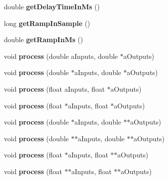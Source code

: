 \begin{DoxyCompactItemize}
\item 
\hypertarget{class_ambisonics_delay_ad0e480317457a85186ae785bb33832a4}{double {\bfseries get\-Delay\-Time\-In\-Ms} ()}\label{class_ambisonics_delay_ad0e480317457a85186ae785bb33832a4}

\item 
\hypertarget{class_ambisonics_delay_a4bd875e75bf16dfcc043bf95637ca1ed}{long {\bfseries get\-Ramp\-In\-Sample} ()}\label{class_ambisonics_delay_a4bd875e75bf16dfcc043bf95637ca1ed}

\item 
\hypertarget{class_ambisonics_delay_a1e652fc67e8033adfe2ca85e94777dd5}{double {\bfseries get\-Ramp\-In\-Ms} ()}\label{class_ambisonics_delay_a1e652fc67e8033adfe2ca85e94777dd5}

\item 
\hypertarget{class_ambisonics_delay_a689b30eb9bcc242a173326aaa0ef9902}{void {\bfseries process} (double a\-Inputs, double $\ast$a\-Outputs)}\label{class_ambisonics_delay_a689b30eb9bcc242a173326aaa0ef9902}

\item 
\hypertarget{class_ambisonics_delay_a1799746298285eab00432c5d7794bff0}{void {\bfseries process} (double $\ast$a\-Inputs, double $\ast$a\-Outputs)}\label{class_ambisonics_delay_a1799746298285eab00432c5d7794bff0}

\item 
\hypertarget{class_ambisonics_delay_ab1fbab149958d6713a77c8627c17d29a}{void {\bfseries process} (float a\-Inputs, float $\ast$a\-Outputs)}\label{class_ambisonics_delay_ab1fbab149958d6713a77c8627c17d29a}

\item 
\hypertarget{class_ambisonics_delay_ad6d98436f1652d522ef1acfecaea0c8c}{void {\bfseries process} (float $\ast$a\-Inputs, float $\ast$a\-Outputs)}\label{class_ambisonics_delay_ad6d98436f1652d522ef1acfecaea0c8c}

\item 
\hypertarget{class_ambisonics_delay_a3e443751cd4229db04e30375a76116f7}{void {\bfseries process} (double $\ast$a\-Inputs, double $\ast$$\ast$a\-Outputs)}\label{class_ambisonics_delay_a3e443751cd4229db04e30375a76116f7}

\item 
\hypertarget{class_ambisonics_delay_aeb97d99deaac12831fcb093112222594}{void {\bfseries process} (double $\ast$$\ast$a\-Inputs, double $\ast$$\ast$a\-Outputs)}\label{class_ambisonics_delay_aeb97d99deaac12831fcb093112222594}

\item 
\hypertarget{class_ambisonics_delay_a2d3baba33f0ff7e63b77cdded8d3e59b}{void {\bfseries process} (float $\ast$a\-Inputs, float $\ast$$\ast$a\-Outputs)}\label{class_ambisonics_delay_a2d3baba33f0ff7e63b77cdded8d3e59b}

\item 
\hypertarget{class_ambisonics_delay_a77e0021d85260c81457f0dd7216582e6}{void {\bfseries process} (float $\ast$$\ast$a\-Inputs, float $\ast$$\ast$a\-Outputs)}\label{class_ambisonics_delay_a77e0021d85260c81457f0dd7216582e6}

\end{DoxyCompactItemize}
